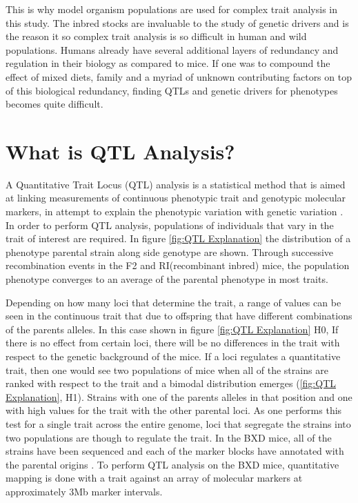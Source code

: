 \documentclass[a4paper]{book}
\begin{document}
	This is why model organism populations are used for complex trait analysis in this study. The inbred stocks are invaluable to the study of genetic drivers and is the reason it so complex trait analysis is so difficult in human and wild populations. Humans already have several additional layers of redundancy and regulation in their biology as compared to mice\citep{Kafri2006Thecircuits}. If one was to compound the effect of mixed diets, family and a myriad of unknown contributing factors on top of this biological redundancy, finding QTLs and genetic drivers for phenotypes becomes quite difficult. 
	
	
	\section{What is QTL Analysis?}
	
	A Quantitative Trait Locus (QTL) analysis is a statistical method that is aimed at linking measurements of continuous phenotypic trait and genotypic molecular markers, in attempt to explain the phenotypic variation with genetic variation \citep{Mackay2009TheProspects}. In order to perform QTL analysis, populations of individuals that vary in the trait of interest are required. In figure \ref{fig:QTL Explanation} the distribution of a phenotype parental strain along side genotype are shown. Through successive recombination events in the F2 and RI(recombinant inbred) mice, the population phenotype converges to an average of the parental phenotype in most traits. 
	
	Depending on how many loci that determine the trait, a range of values can be seen in the continuous trait that due to offspring that have different combinations of the parents alleles. In this case shown in figure \ref{fig:QTL Explanation} H0, If there is no effect from certain loci, there will be no differences in the trait with respect to the genetic background of the mice. If a loci regulates a quantitative trait, then one would see two populations of mice when all of the strains are ranked with respect to the trait and a bimodal distribution emerges (\ref{fig:QTL Explanation}, H1). Strains with one of the parents alleles in that position and one with high values for the trait with the other parental loci\citep{Mackay2009TheProspects}. As one performs this test for a single trait across the entire genome, loci that segregate the strains into two populations are though to regulate the trait. In the BXD mice, all of the strains have been sequenced and each of the marker blocks have annotated with the parental origins \citep{Mulligan2017GeneNetworkGenetics}.  To perform QTL analysis on the BXD mice, quantitative mapping is done with a trait against an array of molecular markers at approximately 3Mb marker intervals. 
	
\end{document}
